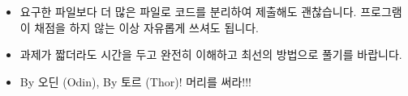 \begin{itemize}
		\item 요구한 파일보다 더 많은 파일로 코드를 분리하여 제출해도 괜찮습니다. 프로그램이 채점을 하지 않는 이상 자유롭게 쓰셔도 됩니다.

		\item 과제가 짧더라도 시간을 두고 완전히 이해하고 최선의 방법으로 풀기를 바랍니다.


        \item By 오딘 (Odin), By 토르 (Thor)! 머리를 써라!!!

\end{itemize}

\newpage

